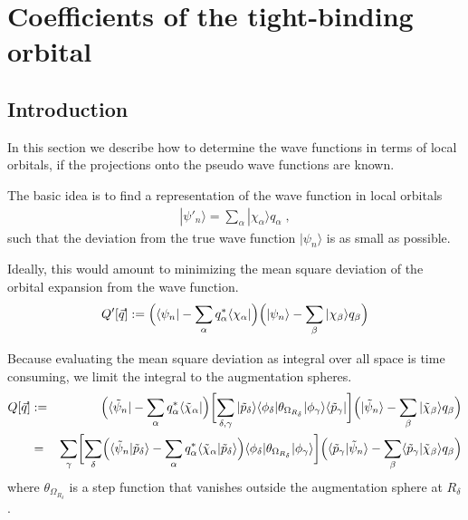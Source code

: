 \documentclass[11pt,a4paper]{report}
\begin{document}
\section{Coefficients of the tight-binding orbital}
\subsection{Introduction}
In this section we describe how to determine the wave functions in
terms of local orbitals, if the projections onto the pseudo wave
functions are known.

The basic idea is to find a representation of the wave function in
local orbitals
\begin{eqnarray}
|\psi'_n\rangle=\sum_\alpha |\chi_\alpha\rangle q_\alpha\;,
\end{eqnarray}
such that the deviation from the true wave function $|\psi_n\rangle$
is as small as possible.

Ideally, this would amount to minimizing the mean square deviation of
the orbital expansion from the wave function.
\begin{eqnarray*}
Q'[\vec{q}]:=\Bigl(\langle\psi_n|-\sum_\alpha q^*_\alpha\langle\chi_\alpha|\Bigr)
\Bigl(|\psi_n\rangle-\sum_\beta |\chi_\beta\rangle q_\beta\Bigr)
\end{eqnarray*}

Because evaluating the mean square deviation as integral over all
space is time consuming, we limit the integral to the augmentation
spheres.
\begin{eqnarray}
Q[\vec{q}]&:=&
\Bigl(\langle\tilde{\psi}_n|
-\sum_\alpha q^*_\alpha\langle\tilde{\chi}_\alpha|\Bigr)
\biggl[\sum_{\delta,\gamma}|\tilde{p}_\delta\rangle\langle\phi_\delta|
\theta_{\Omega_{R_\delta}}|\phi_\gamma\rangle\langle\tilde{p}_\gamma|\biggr]
\Bigl(|\tilde{\psi}_n\rangle
-\sum_\beta |\tilde{\chi}_\beta\rangle q_\beta\Bigr)
\nonumber\\
&=&
\sum_{\gamma}
\biggl[
\sum_{\delta}
\Bigl(\langle\tilde{\psi}_n|\tilde{p}_\delta\rangle
-\sum_\alpha q^*_\alpha\langle\tilde{\chi}_\alpha|\tilde{p}_\delta\rangle\Bigr)
\langle\phi_\delta|\theta_{\Omega_{R_\delta}}|\phi_\gamma\rangle
\biggr]
\Bigl(\langle\tilde{p}_\gamma|\tilde{\psi}_n\rangle
-\sum_\beta \langle\tilde{p}_\gamma|\tilde{\chi}_\beta\rangle q_\beta\Bigr)
\end{eqnarray}
where $\theta_{\Omega_{R_\delta}}$ is a step function that vanishes
outside the augmentation sphere at $R_\delta$.
\end{document}
